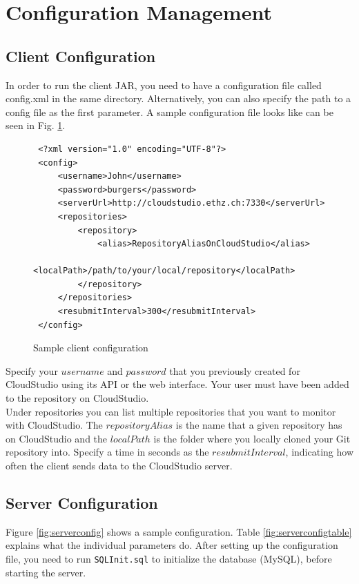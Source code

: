 \section{Configuration Management}\label{configmanagement}

\subsection{Client Configuration}

In order to run the client JAR, you need to have a configuration file called config.xml in the same directory. Alternatively, you can also specify the path to a config file as the first parameter. A sample configuration file looks like can be seen in Fig. \ref{fig:clientconfig}. \\

\begin{figure}[h!]
\begin{lstlisting}
 <?xml version="1.0" encoding="UTF-8"?>
 <config>
     <username>John</username>
     <password>burgers</password>
     <serverUrl>http://cloudstudio.ethz.ch:7330</serverUrl>
     <repositories>
         <repository>
             <alias>RepositoryAliasOnCloudStudio</alias>
             <localPath>/path/to/your/local/repository</localPath>
         </repository>
     </repositories>
     <resubmitInterval>300</resubmitInterval>
 </config>
\end{lstlisting}
  \centering
  \caption{Sample client configuration}
  \label{fig:clientconfig}
\end{figure}


Specify your $username$ and $password$ that you previously created for CloudStudio using its API or the web interface. Your user must have been added to the repository on CloudStudio. \\

Under repositories you can list multiple repositories that you want to monitor with CloudStudio. The $repositoryAlias$ is the name that a given repository has on CloudStudio and the $localPath$ is the folder where you locally cloned your Git repository into. Specify a time in seconds as the $resubmitInterval$, indicating how often the client sends data to the CloudStudio server.


\subsection{Server Configuration}

Figure \ref{fig:serverconfig} shows a sample configuration. Table \ref{fig:serverconfigtable} explains what the individual parameters do. After setting up the configuration file, you need to run \texttt{SQLInit.sql} to initialize the database (MySQL), before starting the server.

